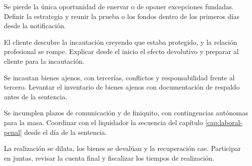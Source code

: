 
\bloqueErrores

{Se pierde la única oportunidad de enervar o de oponer excepciones fundadas.}
{Definir la estrategia y reunir la prueba o los fondos dentro de los primeros días desde
la notificación.}

{El cliente descubre la incautación creyendo que estaba protegido, y la relación
profesional se rompe.}
{Explicar desde el inicio el efecto devolutivo y preparar al cliente para la incautación.}

{Se incautan bienes ajenos, con tercerías, conflictos y responsabilidad frente al
tercero.}
{Levantar el inventario de bienes ajenos con documentación de respaldo antes de la
sentencia.}

{Se incumplen plazos de comunicación y de finiquito, con contingencias autónomas para la
masa.}
{Coordinar con el liquidador la secuencia del capítulo \ref{cap:laboral-penal} desde el
día de la sentencia.}

{La realización se dilata, los bienes se devalúan y la recuperación cae.}
{Participar en juntas, revisar la cuenta final y fiscalizar los tiempos de realización.}
